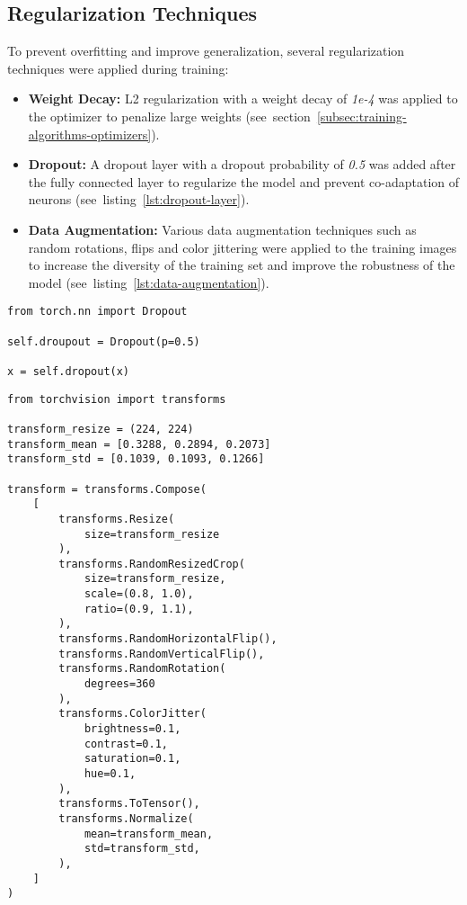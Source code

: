 \subsection{Regularization Techniques}

To prevent overfitting and improve generalization, several regularization techniques were applied during training:

\begin{itemize}
    \item \textbf{Weight Decay:} L2 regularization with a weight decay of \textit{1e-4} was applied to the optimizer to penalize large weights (see~section~\ref{subsec:training-algorithms-optimizers}).
    \item \textbf{Dropout:} A dropout layer with a dropout probability of \textit{0.5} was added after the fully connected layer to regularize the model and prevent co-adaptation of neurons (see~listing~\ref{lst:dropout-layer}).
    \item \textbf{Data Augmentation:} Various data augmentation techniques such as random rotations, flips and color jittering were applied to the training images to increase the diversity of the training set and improve the robustness of the model (see~listing~\ref{lst:data-augmentation}).
\end{itemize}

\begin{minipage}{0.9\linewidth}\begin{lstlisting}[caption={Dropout layer with probability 0.5.},label={lst:dropout-layer}]
from torch.nn import Dropout

self.droupout = Dropout(p=0.5)

x = self.dropout(x)
\end{lstlisting}\end{minipage}

\begin{minipage}{0.9\linewidth}\begin{lstlisting}[caption={Data augmentation transforms (resize, crop, flip, rotation, color jittering).},label={lst:data-augmentation}]
from torchvision import transforms

transform_resize = (224, 224)
transform_mean = [0.3288, 0.2894, 0.2073]
transform_std = [0.1039, 0.1093, 0.1266]

transform = transforms.Compose(
    [
        transforms.Resize(
            size=transform_resize
        ),
        transforms.RandomResizedCrop(
            size=transform_resize,
            scale=(0.8, 1.0),
            ratio=(0.9, 1.1),
        ),
        transforms.RandomHorizontalFlip(),
        transforms.RandomVerticalFlip(),
        transforms.RandomRotation(
            degrees=360
        ),
        transforms.ColorJitter(
            brightness=0.1,
            contrast=0.1,
            saturation=0.1,
            hue=0.1,
        ),
        transforms.ToTensor(),
        transforms.Normalize(
            mean=transform_mean,
            std=transform_std,
        ),
    ]
)
\end{lstlisting}\end{minipage}